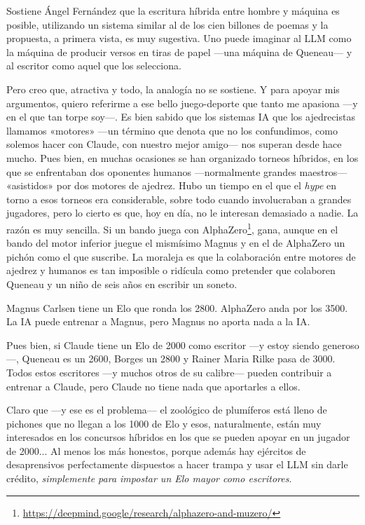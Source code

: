 \documentclass[11pt,a4paper]{article}
\begin{document}
Sostiene Ángel Fernández que la escritura híbrida entre hombre y máquina es posible, utilizando un sistema similar al de los cien billones de poemas y la propuesta, a primera vista, es muy sugestiva. Uno puede imaginar al LLM como la máquina de producir versos en tiras de papel ---una máquina de Queneau--- y al escritor como aquel que los selecciona. 

Pero creo que, atractiva y todo, la analogía no se sostiene. Y para apoyar mis argumentos, quiero referirme a ese bello juego-deporte que tanto me apasiona ---y en el que tan torpe soy---. Es bien sabido que los sistemas IA que los ajedrecistas llamamos «motores» ---un término que denota que no los confundimos, como solemos hacer con Claude, con nuestro mejor amigo--- nos superan desde hace mucho. Pues bien, en muchas ocasiones se han organizado torneos híbridos, en los que se enfrentaban dos oponentes humanos ---normalmente grandes maestros--- «asistidos» por dos motores de ajedrez. Hubo un tiempo en el que el \emph{hype} en torno a esos torneos era considerable, sobre todo cuando involucraban a grandes jugadores, pero lo cierto es que, hoy en día, no le interesan demasiado a nadie. La razón es muy sencilla. Si un bando juega con AlphaZero\footnote{\url{https://deepmind.google/research/alphazero-and-muzero/}}, gana, aunque en el bando del motor inferior juegue el mismísimo Magnus y en el de AlphaZero un pichón como el que suscribe. La moraleja es que la colaboración entre motores de ajedrez y humanos es tan imposible o ridícula como pretender que colaboren Queneau y un niño de seis años en escribir un soneto. 

Magnus Carlsen tiene un Elo que ronda los 2800. AlphaZero anda por los 3500. La IA puede entrenar a Magnus, pero Magnus no aporta nada a la IA.

Pues bien, si Claude tiene un Elo de 2000 como escritor ---y estoy siendo generoso---, Queneau es un 2600, Borges un 2800 y Rainer Maria Rilke pasa de 3000. Todos estos escritores ---y muchos otros de su calibre--- pueden contribuir a entrenar a Claude, pero Claude no tiene nada que aportarles a ellos. 

Claro que ---y ese es el problema--- el zoológico de plumíferos está lleno de pichones que no llegan a los 1000 de Elo y esos, naturalmente, están muy interesados en los concursos híbridos en los que se pueden apoyar en un jugador de 2000... Al menos los más honestos, porque además hay ejércitos de desaprensivos perfectamente dispuestos a hacer trampa y usar el LLM sin darle crédito, \emph{simplemente para impostar un Elo mayor como escritores}. 
\end{document}
